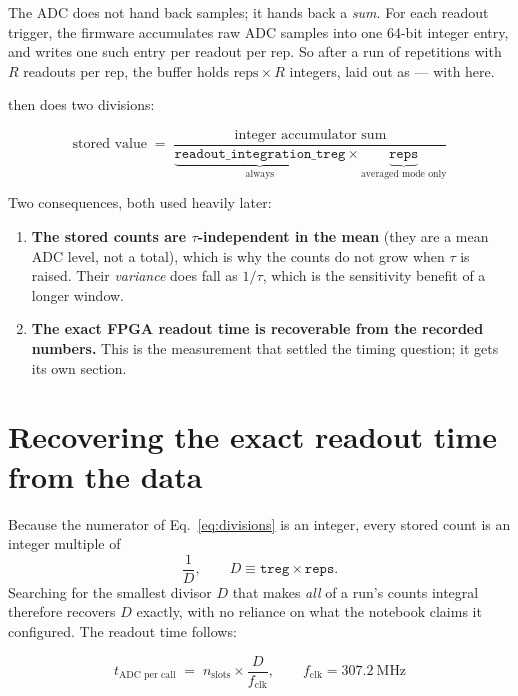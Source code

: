 The ADC does not hand back samples; it hands back a \emph{sum}. For each readout
trigger, the firmware accumulates  raw ADC samples
into one 64-bit integer entry, and writes one such entry per readout per rep. So
after a run of  repetitions with $R$ readouts per rep, the buffer holds
$\text{reps}\times R$ integers, laid out as
 --- with  here.

 then does two divisions:

\begin{equation}
\text{stored value} \;=\; \frac{\text{integer accumulator sum}}
                               {\underbrace{\texttt{readout\_integration\_treg}}_{\text{always}}
                                \times
                                \underbrace{\texttt{reps}}_{\text{averaged mode only}}}
\label{eq:divisions}
\end{equation}

Two consequences, both used heavily later:

\begin{enumerate}
  \item \textbf{The stored counts are $\tau$-independent in the mean} (they are a
  mean ADC level, not a total), which is why the counts do not grow when $\tau$
  is raised. Their \emph{variance} does fall as $1/\tau$, which is the sensitivity
  benefit of a longer window.
  \item \textbf{The exact FPGA readout time is recoverable from the recorded
  numbers.} This is the measurement that settled the timing question; it gets its
  own section.
\end{enumerate}

\section{Recovering the exact readout time from the data}
\label{sec:quantum}

Because the numerator of Eq.~\ref{eq:divisions} is an integer, every stored count
is an integer multiple of
\[
\frac{1}{D},\qquad D \equiv \texttt{treg}\times\texttt{reps}.
\]
Searching for the smallest divisor $D$ that makes \emph{all} of a run's counts
integral therefore recovers $D$ exactly, with no reliance on what the notebook
claims it configured. The readout time follows:

\begin{equation}
\boxed{\;t_\text{ADC per call} \;=\; n_\text{slots}\times \frac{D}{f_\text{clk}},
\qquad f_\text{clk} = \SI{307.2}{\mega\hertz}\;}
\label{eq:recover}
\end{equation}

